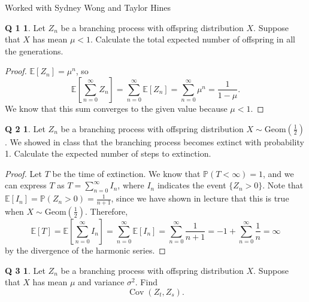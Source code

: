 \documentclass[12pt]{article}
\newcommand{\p}{\mathbb{P}}
\newcommand{\E}{\mathbb{E}}
\DeclareMathOperator{\Cov}{Cov}
\theoremstyle{definition}
\newtheorem*{prob1}{Q 1}
\newtheorem*{prob2}{Q 2}
\newtheorem*{prob3}{Q 3}
\begin{document}
\noindent Worked with Sydney Wong and Taylor Hines
\begin{prob1}
Let $Z_n$ be a branching process with offspring distribution $X$.  Suppose that $X$ has mean $\mu < 1$.  Calculate the total expected number of offspring in all the generations.
\end{prob1}

\begin{proof}
$\E[Z_n] = \mu^n$, so
$$
\E \left[ \sum\limits_{n=0}^\infty Z_n \right] = \sum\limits_{n=0}^\infty \E[Z_n] = \sum\limits_{n=0}^\infty \mu^n = \dfrac{1}{1-\mu}.
$$
We know that this sum converges to the given value because $\mu < 1$.
\end{proof}

\begin{prob2}
Let $Z_n$ be a branching process with offspring distribution $X \sim \text{Geom}(\frac12)$.  We showed in class that the branching process becomes extinct with probability 1.  Calculate the expected number of steps to extinction.
\end{prob2}

\begin{proof}
Let $T$ be the time of extinction.  We know that $\p(T < \infty) = 1$, and we can express $T$ as $T = \sum\limits_{n=0}^\infty I_n$, where $I_n$ indicates the event $\{Z_n > 0 \}$.  Note that $\E[I_n] = \p(Z_n > 0) = \frac{1}{n+1}$, since we have shown in lecture that this is true when $X \sim \text{Geom}(\frac12)$. Therefore,
$$
\E[T] = \E \left[ \sum\limits_{n=0}^\infty I_n \right] = \sum\limits_{n=0}^\infty \E[I_n] = \sum\limits_{n=0}^\infty \frac{1}{n+1} = -1 + \sum\limits_{n=0}^\infty \frac{1}{n} = \infty
$$
by the divergence of the harmonic series.
\end{proof}

\begin{prob3}
Let $Z_n$ be a branching process with offspring distribution $X$.  Suppose that $X$ has mean $\mu$ and variance $\sigma^2$.  Find $$\Cov(Z_t,Z_s).$$
\end{prob3}
\end{document}
